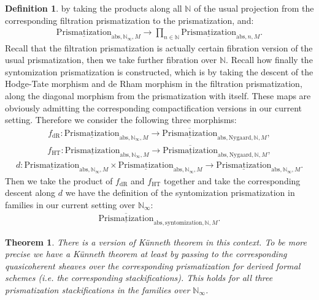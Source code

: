 \documentclass[12pt]{article}
\newtheorem{theorem}{Theorem}
\theoremstyle{definition}
\newtheorem{definition}{Definition}
\begin{document}
\begin{definition}
by taking the products along all $\mathbb{N}$ of the usual projection from the corresponding filtration prismatization to the prismatization, and:
\begin{align}
{\underline{\mathrm{Prismatization}}}_{\mathrm{abs},\mathbb{N}_\infty,M}\rightarrow  \prod_{n\in \mathbb{N}} {\underline{\mathrm{Prismatization}}}_{\mathrm{abs},n,M}.
\end{align}
Recall that the filtration prismatization is actually certain fibration version of the usual prismatization, then we take further fibration over $\mathbb{N}$. Recall how finally the syntomization prismatization is constructed, which is by taking the descent of the Hodge-Tate morphism and de Rham morphism in the filtration prismatization, along the diagonal morphism from the prismatization with itself. These maps are obviously admitting the corresponding compactification versions in our current setting. Therefore we consider the following three morphisms:
\begin{align}
f_\mathrm{dR}: {\underline{\mathrm{Prismatization}}}_{\mathrm{abs},\mathbb{N}_\infty,M}\rightarrow \overline{\underline{\mathrm{Prismatization}}}_{\mathrm{abs},\mathrm{Nygaard},\mathbb{N},M},
\end{align}
\begin{align}
f_\mathrm{HT}: {\underline{\mathrm{Prismatization}}}_{\mathrm{abs},\mathbb{N}_\infty,M}\rightarrow \overline{\underline{\mathrm{Prismatization}}}_{\mathrm{abs},\mathrm{Nygaard},\mathbb{N},M},
\end{align}
\begin{align}
d:  {\underline{\mathrm{Prismatization}}}_{\mathrm{abs},\mathbb{N}_\infty,M}\times {\underline{\mathrm{Prismatization}}}_{\mathrm{abs},\mathbb{N}_\infty,M} \rightarrow {\underline{\mathrm{Prismatization}}}_{\mathrm{abs},\mathbb{N}_\infty,M}.
\end{align}
Then we take the product of $f_\mathrm{dR}$ and $f_\mathrm{HT}$ together and take the corresponding descent along $d$ we have the definition of the syntomization prismatization in families in our current setting over $\mathbb{N}_\infty$:
\begin{align}
\overline{\underline{\mathrm{Prismatization}}}_{\mathrm{abs},\mathrm{syntomization},\mathbb{N},M}.
\end{align}
\end{definition}



\begin{theorem}
There is a version of K\"unneth theorem in this context. To be more precise we have a K\"unneth theorem at least by passing to the corresponding quasicoherent sheaves over the corresponding prismatization for derived formal schemes (i.e. the corresponding stackifications). This holds for all three prismatization stackifications in the families over $\mathbb{N}_\infty$. 
\end{theorem}
\end{document}

